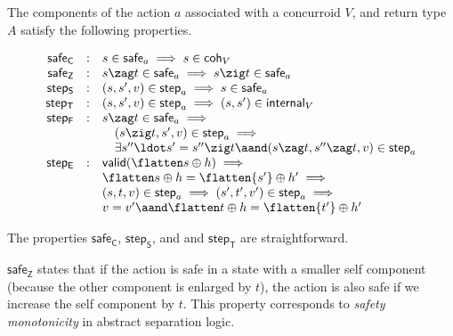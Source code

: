 The components of the action $a$ associated with a concurroid $V$, and
return type $A$ satisfy the following properties.

\[
\begin{array}{rcl}
\mathsf{safe_C} & : & s \in \mathsf{safe}_a \implies s \in \mathsf{coh}_V\\
\mathsf{safe_Z} & : & s \zag t \in \mathsf{safe}_a \implies s \zig t \in \mathsf{safe}_a\\
\mathsf{step_S} & : & (s, s', v) \in \mathsf{step}_a \implies s \in \mathsf{safe}_a\\
\mathsf{step_T} & : & (s, s', v) \in \mathsf{step}_a \implies (s, s') \in \mathsf{internal}_V\\
\mathsf{step_F} & : & s \zag t \in \mathsf{safe}_a \implies \hbox{}\\
& & \quad (s \zig t, s', v) \in \mathsf{step}_a \implies \hbox{}\\
& & \quad \exists s''\ldot s' = s'' \zig t \aand  (s \zag t, s'' \zag t, v) \in \mathsf{step}_a\\
\mathsf{step_E} & : &  \mathsf{valid} (\flatten s \oplus h) \implies \hbox{}\\
& &  \flatten s \oplus h = \flatten{s'} \oplus h' \implies \hbox{}\\
& &  (s, t, v) \in \mathsf{step}_a \implies (s', t', v') \in \mathsf{step}_a \implies \hbox{}\\
& &  v = v' \aand \flatten t \oplus h = \flatten{t'} \oplus h'
\end{array}
\]


The properties $\mathsf{safe_C}$, $\mathsf{step_S}$, and and
$\mathsf{step_T}$ are straightforward.

$\mathsf{safe_Z}$ states that if the action is safe in a state with a
smaller self component (because the other component is enlarged by
$t$), the action is also safe if we increase the self component by
$t$. This property corresponds to \emph{safety monotonicity} in
abstract separation logic.

